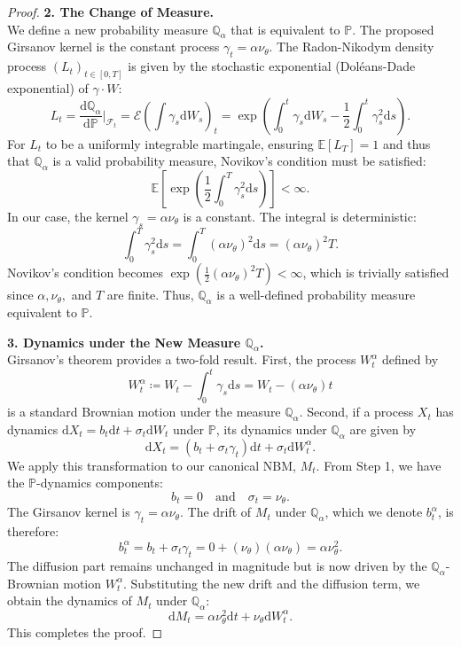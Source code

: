 \documentclass[qian]{imsart}
\newcommand{\Qbb}{\mathbb{Q}}
\newcommand{\Prob}{\mathbb{P}}
\newcommand{\E}{\mathbb{E}}
\newcommand{\Fcal}{\mathcal{F}}
\newcommand{\dd}{\mathrm{d}}
\theoremstyle{plain}
\theoremstyle{definition}
\begin{document}
\begin{proof}
\noindent\textbf{2. The Change of Measure.} \\
We define a new probability measure $\Qbb_\alpha$ that is equivalent to $\Prob$. The proposed Girsanov kernel is the constant process $\gamma_t = \alpha \nu_\theta$. The Radon-Nikodym density process $(L_t)_{t \in [0,T]}$ is given by the stochastic exponential (Doléans-Dade exponential) of $\gamma \cdot W$:
\[
    L_t = \frac{\dd\Qbb_\alpha}{\dd\Prob}\bigg|_{\Fcal_t} = \mathcal{E}\left(\int \gamma_s \dd W_s\right)_t = \exp\left( \int_0^t \gamma_s \dd W_s - \frac{1}{2} \int_0^t \gamma_s^2 \dd s \right).
\]
For $L_t$ to be a uniformly integrable martingale, ensuring $\E[L_T]=1$ and thus that $\Qbb_\alpha$ is a valid probability measure, Novikov's condition must be satisfied:
\[
    \E\left[\exp\left(\frac{1}{2}\int_0^T \gamma_s^2 \dd s\right)\right] < \infty.
\]
In our case, the kernel $\gamma_s = \alpha \nu_\theta$ is a constant. The integral is deterministic:
\[
    \int_0^T \gamma_s^2 \dd s = \int_0^T (\alpha \nu_\theta)^2 \dd s = (\alpha \nu_\theta)^2 T.
\]
Novikov's condition becomes $\exp\left(\frac{1}{2}(\alpha \nu_\theta)^2 T\right) < \infty$, which is trivially satisfied since $\alpha, \nu_\theta,$ and $T$ are finite. Thus, $\Qbb_\alpha$ is a well-defined probability measure equivalent to $\Prob$.

\noindent\textbf{3. Dynamics under the New Measure $\Qbb_\alpha$.}\\
Girsanov's theorem provides a two-fold result. First, the process $W^{\alpha}_t$ defined by
\[
    W^{\alpha}_t \coloneqq W_t - \int_0^t \gamma_s \dd s = W_t - (\alpha \nu_\theta) t
\]
is a standard Brownian motion under the measure $\Qbb_\alpha$. Second, if a process $X_t$ has dynamics $\dd X_t = b_t \dd t + \sigma_t \dd W_t$ under $\Prob$, its dynamics under $\Qbb_\alpha$ are given by
\[
    \dd X_t = \left( b_t + \sigma_t \gamma_t \right) \dd t + \sigma_t \dd W^{\alpha}_t.
\]
We apply this transformation to our canonical NBM, $M_t$. From Step 1, we have the $\Prob$-dynamics components:
\[
    b_t = 0 \quad \text{and} \quad \sigma_t = \nu_\theta.
\]
The Girsanov kernel is $\gamma_t = \alpha \nu_\theta$. The drift of $M_t$ under $\Qbb_\alpha$, which we denote $b^{\alpha}_t$, is therefore:
\[
    b^{\alpha}_t = b_t + \sigma_t \gamma_t = 0 + (\nu_\theta)(\alpha \nu_\theta) = \alpha \nu_\theta^2.
\]
The diffusion part remains unchanged in magnitude but is now driven by the $\Qbb_\alpha$-Brownian motion $W^{\alpha}_t$. Substituting the new drift and the diffusion term, we obtain the dynamics of $M_t$ under $\Qbb_\alpha$:
\[
    \dd M_t = \alpha \nu_\theta^2 \dd t + \nu_\theta \dd W^{\alpha}_t.
\]
This completes the proof.
\end{proof}
\end{document}
